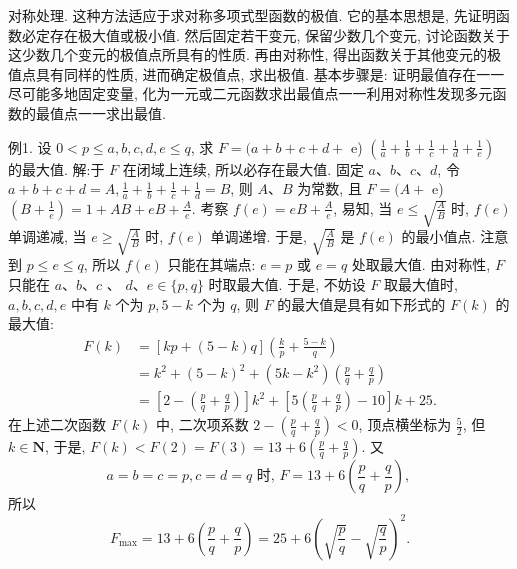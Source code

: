 
对称处理.
这种方法适应于求对称多项式型函数的极值.
它的基本思想是, 先证明函数必定存在极大值或极小值.
然后固定若干变元, 保留少数几个变元, 讨论函数关于这少数几个变元的极值点所具有的性质.
再由对称性, 得出函数关于其他变元的极值点具有同样的性质, 进而确定极值点, 求出极值.
基本步骤是: 证明最值存在一一尽可能多地固定变量, 化为一元或二元函数求出最值点一一利用对称性发现多元函数的最值点一一求出最值.



例1. 设 $0<p \leqslant a, b, c, d, e \leqslant q$, 求 $F=(a+b+c+d+$ e) $\left(\frac{1}{a}+\frac{1}{b}+\frac{1}{c}+\frac{1}{d}+\frac{1}{e}\right)$ 的最大值.
解:于 $F$ 在闭域上连续, 所以必存在最大值.
固定 $a 、 b 、 c 、 d$, 令 $a+ b+c+d=A, \frac{1}{a}+\frac{1}{b}+\frac{1}{c}+\frac{1}{d}=B$, 则 $A 、 B$ 为常数, 且 $F=(A+$ e) $\left(B+\frac{1}{e}\right)=1+A B+e B+\frac{A}{e}$.
考察 $f(e)=e B+\frac{A}{e}$, 易知, 当 $e \leqslant \sqrt{\frac{A}{B}}$ 时, $f(e)$ 单调递减, 当 $e \geqslant \sqrt{\frac{A}{B}}$ 时, $f(e)$ 单调递增.
于是, $\sqrt{\frac{A}{B}}$ 是 $f(e)$ 的最小值点.
注意到 $p \leqslant e \leqslant q$, 所以 $f(e)$ 只能在其端点: $e=p$ 或 $e=q$ 处取最大值.
由对称性, $F$ 只能在 $a 、 b 、 c$ 、 $d 、 e \in\{p, q\}$ 时取最大值.
于是, 不妨设 $F$ 取最大值时, $a, b, c, d, e$ 中有 $k$ 个为 $p, 5-k$ 个为 $q$, 则 $F$ 的最大值是具有如下形式的 $F(k)$ 的最大值:
$$
\begin{aligned}
F(k) & =[k p+(5-k) q]\left(\frac{k}{p}+\frac{5-k}{q}\right) \\
& =k^2+(5-k)^2+\left(5 k-k^2\right)\left(\frac{p}{q}+\frac{q}{p}\right) \\
& =\left[2-\left(\frac{p}{q}+\frac{q}{p}\right)\right] k^2+\left[5\left(\frac{p}{q}+\frac{q}{p}\right)-10\right] k+25 .
\end{aligned}
$$
在上述二次函数 $F(k)$ 中, 二次项系数 $2-\left(\frac{p}{q}+\frac{q}{p}\right)<0$, 顶点横坐标为 $\frac{5}{2}$, 但 $k \in \mathbf{N}$, 于是, $F(k)<F(2)=F(3)=13+6\left(\frac{p}{q}+\frac{q}{p}\right)$. 又
$$
a=b=c=p, c=d=q \text { 时, } F=13+6\left(\frac{p}{q}+\frac{q}{p}\right) \text {, }
$$
所以
$$
F_{\max }=13+6\left(\frac{p}{q}+\frac{q}{p}\right)=25+6\left(\sqrt{\frac{p}{q}}-\sqrt{\frac{q}{p}}\right)^2 .
$$



